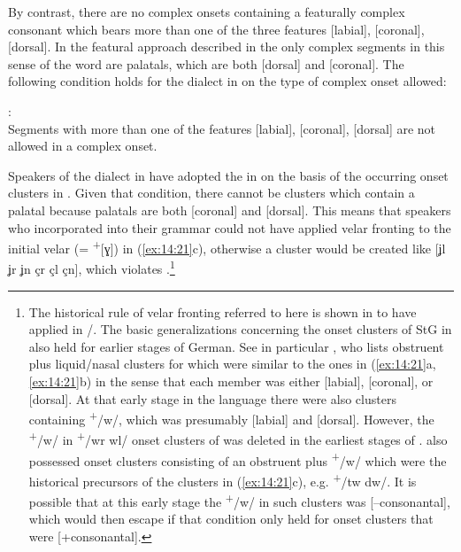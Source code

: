 By contrast, there are no complex onsets containing a featurally complex consonant which bears more than one of the three features [labial], [coronal], [dorsal]. In the featural approach described in  the only complex segments in this sense of the word are palatals, which are both [dorsal] and [coronal]. The following condition holds for the dialect in  on the type of complex onset allowed:

\ea%
\label{ex:14:22}
  \textsc{}:\\
  Segments with more than one of the features [labial], [coronal], [dorsal] are not allowed in a complex onset.
\z 

Speakers of the dialect in  have adopted the  in  on the basis of the occurring onset clusters in . Given that condition, there cannot be clusters which contain a palatal because palatals are both [coronal] and [dorsal]. This means that speakers who incorporated  into their grammar could not have applied velar fronting to the initial velar (= \textsuperscript{+}[ɣ]) in (\ref{ex:14:21}c), otherwise a cluster would be created like [ʝl ʝr ʝn çr çl çn],  which violates .\footnote{{The historical rule of velar fronting referred to here is shown in  to have applied in /. The basic generalizations concerning the onset clusters of StG in  also held for earlier stages of German. See in particular \citet[167]{Moulton1972}, who lists obstruent plus liquid/nasal clusters for  which were similar to the ones in (\ref{ex:14:21}a, \ref{ex:14:21}b) in the sense that each member was either [labial], [coronal], or [dorsal]. At that early stage in the language there were also clusters containing} \textrm{\textsuperscript{+}}\textrm{/w/, which was presumably [labial] and [dorsal]. However, the} \textrm{\textsuperscript{+}}\textrm{/w/ in} \textrm{\textsuperscript{+}}\textrm{/wr wl/ onset clusters of  was deleted in the earliest stages of  \citep[108]{Braune2004}.  also possessed onset clusters consisting of an obstruent plus} \textrm{\textsuperscript{+}}\textrm{/w/ which were the historical precursors of the clusters in (\ref{ex:14:21}c), e.g.} \textrm{\textsuperscript{+}}\textrm{/tw dw/. It is possible that at this early stage the} \textrm{\textsuperscript{+}}\textrm{/w/ in such clusters was [--consonantal], which would then escape  if that condition only held for onset clusters that were [+consonantal].} }

